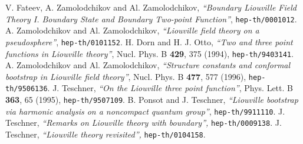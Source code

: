 \documentclass[a4paper,11pt]{article}
\begin{document}

 V. Fateev, A. Zamolodchikov and Al. Zamolodchikov,
    {\sl ``Boundary Liouville Field Theory I.
           Boundary State and Boundary Two-point Function''},
    {\tt hep-th/0001012}.
 A. Zamolodchikov and Al. Zamolodchikov,
    {\sl ``Liouville field theory on a pseudosphere''},
    {\tt hep-th/0101152}.
 H. Dorn and H. J. Otto,
    {\sl ``Two and three point functions in Liouville theory''},
    Nucl. Phys. B {\bf 429}, 375 (1994), {\tt hep-th/9403141}.
 A. Zamolodchikov and Al. Zamolodchikov,
    {\sl ``Structure constants and conformal bootstrap
           in Liouville field theory''},
    Nucl. Phys. B {\bf 477}, 577 (1996), {\tt hep-th/9506136}.
 J. Teschner,
    {\sl ``On the Liouville three point function''},
    Phys. Lett. B {\bf 363}, 65 (1995), {\tt hep-th/9507109}.
 B. Ponsot and J. Teschner,
    {\sl ``Liouville bootstrap via harmonic analysis
           on a noncompact quantum group''},
    {\tt hep-th/9911110}.
 J. Teschner,
    {\sl ``Remarks on Liouville theory with boundary'',}
    {\tt hep-th/0009138}.
 J. Teschner,
    {\sl ``Liouville theory revisited'',}
    {\tt hep-th/0104158}.
\end{document}
